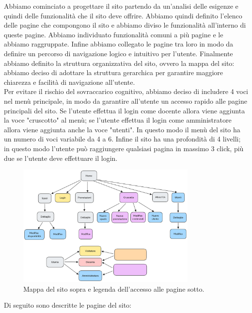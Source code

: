 Abbiamo cominciato a progettare il sito partendo da un'analisi delle esigenze e
quindi delle funzionalità che il sito deve offrire. Abbiamo quindi definito
l'elenco delle pagine che compongono il sito e abbiamo diviso le funzionalità
all'interno di queste pagine.
Abbiamo individuato funzionalità comuni a più pagine e le abbiamo raggruppate.
Infine abbiamo collegato le pagine tra loro in modo da definire un percorso
di navigazione logico e intuitivo per l'utente.
Finalmente abbiamo definito la struttura organizzativa del sito, ovvero la
mappa del sito: abbiamo deciso di adottare la struttura gerarchica per garantire
maggiore chiarezza e facilità di navigazione all'utente.\\
Per evitare il rischio del sovraccarico cognitivo, abbiamo deciso di includere 4
voci nel menù principale, in modo da garantire all'utente un accesso rapido alle
pagine principali del sito. Se l'utente effettua il login come docente allora
viene aggiunta la voce "cruscotto" al menù; se l'utente effettua il login come
amministratore allora viene aggiunta anche la voce "utenti". In questo modo il
menù del sito ha un numero di voci variabile da 4 a 6. Infine il sito ha una
profondità di 4 livelli; in questo modo l'utente può raggiungere qualsiasi
pagina in massimo 3 click, più due se l'utente deve effettuare il login.

\begin{figure}[h]
	\centering
	\includegraphics[width=0.8\textwidth]{figures/sitemap.png}
	\caption{Mappa del sito sopra e legenda dell'accesso alle pagine sotto.}
\end{figure}

Di seguito sono descritte le pagine del sito:

